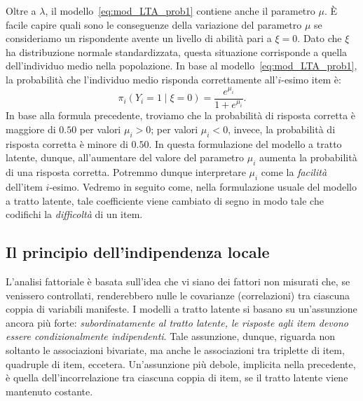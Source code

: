 Oltre a $\lambda$, il modello~\ref{eq:mod_LTA_prob1} contiene anche il parametro $\mu$.
%
È facile capire quali sono le conseguenze della variazione del parametro $\mu$ se consideriamo un rispondente avente un livello di abilità pari a $\xi = 0$. 
Dato che $\xi$ ha distribuzione normale standardizzata, questa situazione corrisponde a quella dell'individuo medio nella popolazione.  
In base al modello~\ref{eq:mod_LTA_prob1}, la probabilità che l'individuo medio risponda correttamente all'$i$-esimo item è: 
\begin{equation}
\pi_i(Y_i=1 \mid \xi=0) = \frac{ e^{\mu_i} }{1+e^{\mu_i}}.
\end{equation}
In base alla formula precedente, troviamo che la probabilità di risposta corretta è maggiore di $0.50$ per valori $\mu_i > 0$; per valori $\mu_i<0$, invece, la probabilità di risposta corretta è minore di $0.50$.
In questa formulazione del modello a tratto latente, dunque, all'aumentare del valore del parametro $\mu_i$ aumenta la probabilità di una risposta corretta.
Potremmo dunque interpretare $\mu_i$ come la \emph{facilità} dell'item $i$-esimo.
Vedremo in seguito come, nella formulazione usuale del modello a tratto latente,  tale coefficiente viene cambiato di segno in modo tale che codifichi la \emph{difficoltà} di un item.

\subsection{Il principio dell'indipendenza locale}

L'analisi fattoriale è basata sull'idea che vi siano dei fattori non misurati che, se venissero controllati, renderebbero nulle le covarianze (correlazioni) tra ciascuna coppia di variabili manifeste.  
I modelli a tratto latente si basano su un'assunzione ancora più forte: \emph{subordinatamente al tratto latente, le risposte agli item devono essere condizionalmente indipendenti}.  
Tale assunzione, dunque, riguarda non soltanto le associazioni bivariate, ma anche le associazioni tra triplette di item, quadruple di item, eccetera.  
Un'assunzione più debole, implicita nella precedente, è quella dell'incorrelazione tra ciascuna coppia di item, se il tratto latente viene mantenuto costante. 

